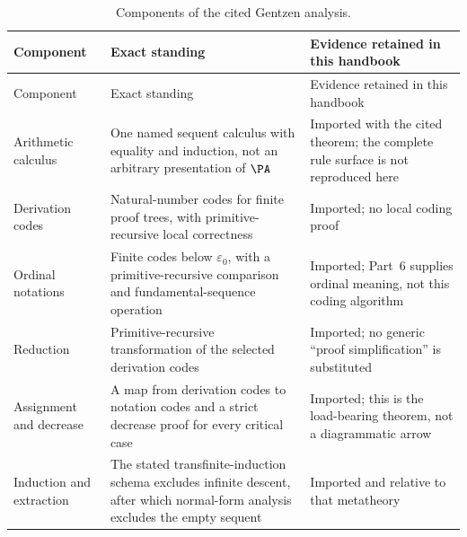 \begingroup\small
\begin{longtable}{@{}p{}p{}p{}@{}}
\caption{Components of the cited Gentzen analysis.}
\label{tab:p07-gentzen-components}\\
\toprule
Component & Exact standing & Evidence retained in this handbook \\
\midrule
\endfirsthead
\toprule
Component & Exact standing & Evidence retained in this handbook \\
\midrule
\endhead
Arithmetic calculus & One named sequent calculus with equality and induction,
not an arbitrary presentation of \(\PA\) & Imported with the cited theorem;
the complete rule surface is not reproduced here \\
Derivation codes & Natural-number codes for finite proof trees, with
primitive-recursive local correctness & Imported; no local coding proof \\
Ordinal notations & Finite codes below \(\varepsilon_0\), with a
primitive-recursive comparison and fundamental-sequence operation & Imported;
Part~6 supplies ordinal meaning, not this coding algorithm \\
Reduction & Primitive-recursive transformation of the selected derivation
codes & Imported; no generic ``proof simplification'' is substituted \\
Assignment and decrease & A map from derivation codes to notation codes and a
strict decrease proof for every critical case & Imported; this is the
load-bearing theorem, not a diagrammatic arrow \\
Induction and extraction & The stated transfinite-induction schema excludes
infinite descent, after which normal-form analysis excludes the empty sequent
& Imported and relative to that metatheory \\
\bottomrule
\end{longtable}
\endgroup


